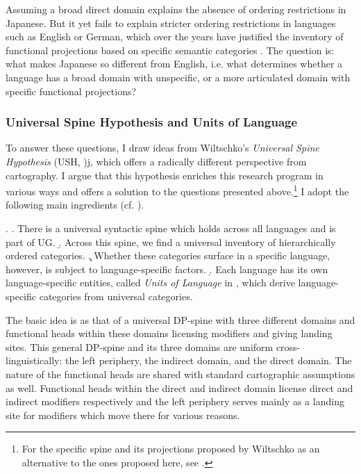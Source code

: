 \documentclass [output=book,colorlinks,citecolor=brown]{langscibook}
\begin{document}
Assuming a broad direct domain explains the absence of ordering restrictions in Japanese. But it yet fails to explain stricter ordering restrictions in languages such as English or German, which over the years have justified the inventory of functional projections based on specific semantic categories \citep{cinque:2010:adj, cinque:2025:superiority, laenzlinger:2011:elements}. The question is: what makes Japanese so different from English, i.e. what determines whether a language has a broad domain with unspecific, or a more articulated domain with specific functional projections?

\subsubsection{Universal Spine Hypothesis and Units of Language} \label{units of language}

To answer these questions, I draw ideas from Wiltschko's \textit{Universal Spine Hypothesis} (USH, \citealt[24–26]{wiltschko:2014:universal})j, which offers a radically different perspective from cartography. I argue that this hypothesis enriches this research program in various ways and offers a solution to the questions presented above.\footnote{For the specific spine and its projections proposed by Wiltschko as an alternative to the ones proposed here, see \citet[ch. 2]{wiltschko:2014:universal}.} I adopt the following main ingredients (cf. \citealt[ch. 1, 2]{wiltschko:2014:universal}). %


\ex. \a. There is a universal syntactic spine which holds across all languages and is part of UG.
\b. Across this spine, we find a universal inventory of hierarchically ordered categories.
\c. Whether these categories surface in a specific language, however, is subject to language-specific factors.
\d. Each language has its own language-specific entities, called \textit{Units of Language} in \citet[1]{wiltschko:2014:universal}, which derive language-specific categories from universal categories.

The basic idea is as that of a universal DP-spine with three different domains and functional heads within these domains licensing modifiers and giving landing sites. This general DP-spine and its three domains are uniform cross-linguistically: the left periphery, the indirect domain, and the direct domain. The nature of the functional heads are shared with standard cartographic assumptions as well. Functional heads within the direct and indirect domain license direct and indirect modifiers respectively and the left periphery serves mainly as a landing site for modifiers which move there for various reasons.
\end{document}
